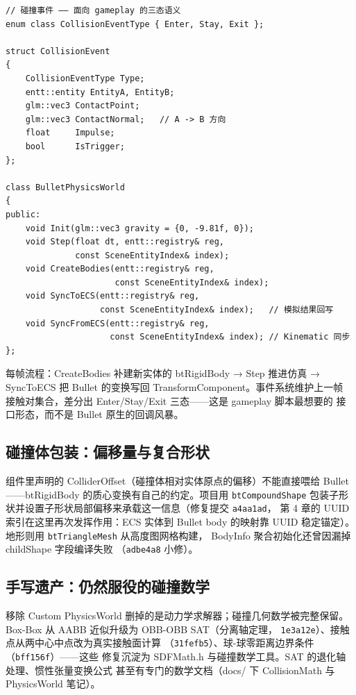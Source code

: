 \begin{lstlisting}
// 碰撞事件 —— 面向 gameplay 的三态语义
enum class CollisionEventType { Enter, Stay, Exit };

struct CollisionEvent
{
    CollisionEventType Type;
    entt::entity EntityA, EntityB;
    glm::vec3 ContactPoint;
    glm::vec3 ContactNormal;   // A -> B 方向
    float     Impulse;
    bool      IsTrigger;
};

class BulletPhysicsWorld
{
public:
    void Init(glm::vec3 gravity = {0, -9.81f, 0});
    void Step(float dt, entt::registry& reg,
              const SceneEntityIndex& index);
    void CreateBodies(entt::registry& reg,
                      const SceneEntityIndex& index);
    void SyncToECS(entt::registry& reg,
                   const SceneEntityIndex& index);   // 模拟结果回写
    void SyncFromECS(entt::registry& reg,
                     const SceneEntityIndex& index); // Kinematic 同步
};
\end{lstlisting}

每帧流程：CreateBodies 补建新实体的 btRigidBody → Step 推进仿真 →
SyncToECS 把 Bullet 的变换写回 TransformComponent。事件系统维护上一帧
接触对集合，差分出 Enter/Stay/Exit 三态——这是 gameplay 脚本最想要的
接口形态，而不是 Bullet 原生的回调风暴。

\subsection{碰撞体包装：偏移量与复合形状}

组件里声明的 ColliderOffset（碰撞体相对实体原点的偏移）不能直接喂给
Bullet——btRigidBody 的质心变换有自己的约定。项目用 \texttt{btCompoundShape}
包装子形状并设置子形状局部偏移来承载这一信息（修复提交 \texttt{a4aa1ad}，
第 4 章的 UUID 索引在这里再次发挥作用：ECS 实体到 Bullet body 的映射靠
UUID 稳定锚定）。地形则用 \texttt{btTriangleMesh} 从高度图网格构建，
BodyInfo 聚合初始化还曾因漏掉 childShape 字段编译失败
（\texttt{adbe4a8} 小修）。

\subsection{手写遗产：仍然服役的碰撞数学}

移除 Custom PhysicsWorld 删掉的是动力学求解器；碰撞几何数学被完整保留。
Box-Box 从 AABB 近似升级为 OBB-OBB SAT（分离轴定理，
\texttt{1e3a12e}）、接触点从两中心中点改为真实接触面计算
（\texttt{31fefb5}）、球-球零距离边界条件（\texttt{bff156f}）——这些
修复沉淀为 SDFMath.h 与碰撞数学工具。SAT 的退化轴处理、惯性张量变换公式
甚至有专门的数学文档（docs/ 下 CollisionMath 与 PhysicsWorld 笔记）。

